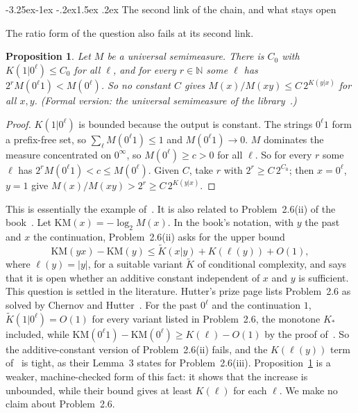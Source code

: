 \documentclass[11pt]{article}
\makeatletter
\renewcommand\subsection{\@startsection{subsection}{2}{\z@}%
  {-3.25ex\@plus -1ex \@minus -.2ex}{1.5ex \@plus .2ex}%
  {\normalfont\large\bfseries\boldmath}}
\newcommand{\N}{\mathbb{N}}
\newcommand{\KM}{\mathrm{KM}}
\newtheorem{proposition}[theorem]{Proposition}
\theoremstyle{definition}
\theoremstyle{remark}
\makeatother
\begin{document}
\subsection{The second link of the chain, and what stays open}

The ratio form of the question also fails at its second link.

\begin{proposition}\label{prop:63R}
Let $M$ be a universal semimeasure. There is $C_0$ with $K(1|0^\ell)\le C_0$
for all $\ell$, and for every $r\in\N$ some $\ell$ has $2^r M(0^\ell1)<M(0^\ell)$.
So no constant $C$ gives $M(x)/M(xy)\le C\,2^{K(y|x)}$ for all $x,y$.
(Formal version: the universal semimeasure of the library~\cite{milovanovlean}.)
\end{proposition}

\begin{proof}
$K(1|0^\ell)$ is bounded because the output is constant. The strings $0^\ell1$
form a prefix-free set, so $\sum_\ell M(0^\ell1)\le1$ and $M(0^\ell1)\to0$.
$M$ dominates the measure concentrated on $0^\infty$, so $M(0^\ell)\ge c>0$
for all $\ell$. So for every $r$ some $\ell$ has $2^rM(0^\ell1)<c\le M(0^\ell)$.
Given $C$, take $r$ with $2^r\ge C\,2^{C_0}$; then $x=0^\ell$, $y=1$ give
$M(x)/M(xy)>2^r\ge C\,2^{K(y|x)}$.
\end{proof}

This is essentially the example of~\cite[Lemma~5]{chernovhutterschmidhuber2007}.
It is also related to Problem~2.6(ii) of the book~\cite[p.~61]{hutter2005uai}.
Let $\KM(x)=-\log_2M(x)$. In the book's notation, with $y$ the past and $x$ the
continuation, Problem~2.6(ii) asks for the upper bound
\[
\KM(yx)-\KM(y)\le\tilde K(x|y)+K(\ell(y))+O(1),
\]
where $\ell(y)=|y|$, for a
suitable variant $\tilde K$ of conditional complexity, and says that it is open whether an additive
constant independent of $x$ and $y$ is sufficient. This question is settled in
the literature. Hutter's prize page lists Problem~2.6 as solved by Chernov and
Hutter~\cite{hutterprizepage,chernovhutter2005}. For the past $0^\ell$ and the
continuation $1$, $\tilde K(1|0^\ell)=O(1)$ for every variant listed in
Problem~2.6, the monotone $K_*$ included, while
$\KM(0^\ell1)-\KM(0^\ell)\ge K(\ell)-O(1)$ by the proof
of~\cite[Lemma~5]{chernovhutterschmidhuber2007}. So the additive-constant
version of Problem~2.6(ii) fails, and the $K(\ell(y))$ term
of~\cite[Thm.~1]{chernovhutterschmidhuber2007} is tight, as their Lemma~3 states
for Problem~2.6(iii). Proposition~\ref{prop:63R} is a weaker, machine-checked
form of this fact: it shows that the increase is unbounded, while their bound
gives at least $K(\ell)$ for each $\ell$. We make no claim about Problem~2.6.
\end{document}
